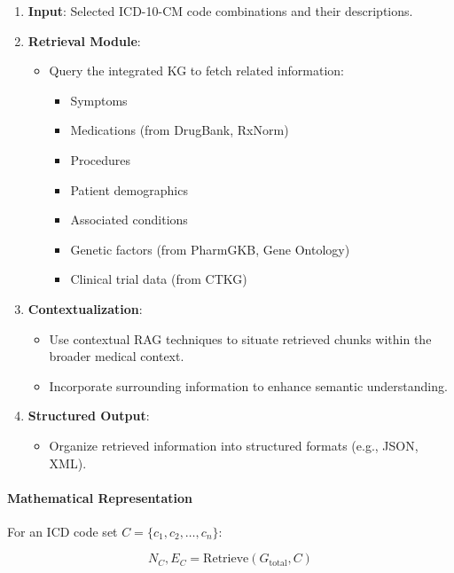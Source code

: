 \documentclass[12pt, a4paper]{article}
\begin{document}
\begin{enumerate}
    \item \textbf{Input}: Selected ICD-10-CM code combinations and their descriptions.
    \item \textbf{Retrieval Module}:
    \begin{itemize}
        \item Query the integrated KG to fetch related information:
        \begin{itemize}
            \item Symptoms
            \item Medications (from DrugBank, RxNorm)
            \item Procedures
            \item Patient demographics
            \item Associated conditions
            \item Genetic factors (from PharmGKB, Gene Ontology)
            \item Clinical trial data (from CTKG)
        \end{itemize}
    \end{itemize}
    \item \textbf{Contextualization}:
    \begin{itemize}
        \item Use contextual RAG techniques to situate retrieved chunks within the broader medical context.
        \item Incorporate surrounding information to enhance semantic understanding.
    \end{itemize}
    \item \textbf{Structured Output}:
    \begin{itemize}
        \item Organize retrieved information into structured formats (e.g., JSON, XML).
    \end{itemize}
\end{enumerate}

\paragraph{Mathematical Representation}

For an ICD code set \( C = \{c_1, c_2, \dots, c_n\} \):

\begin{equation}
N_C, E_C = \text{Retrieve}(G_{\text{total}}, C)
\end{equation}
\end{document}
